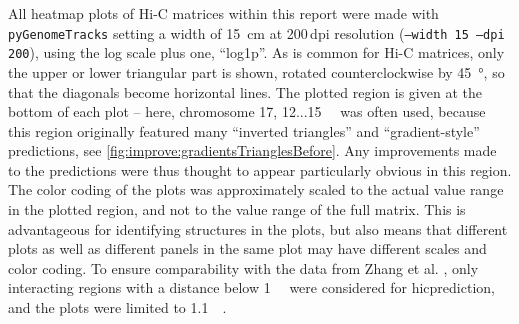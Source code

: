 All heatmap plots of Hi-C matrices within this report were made with \texttt{pyGenomeTracks} setting a width of \SI{15}{\centi\meter}
at 200\,dpi resolution (\texttt{--width 15 --dpi 200}), using the log scale plus one, ``log1p''.
As is common for Hi-C matrices, only the upper or lower triangular part is shown, rotated counterclockwise by \SI{45}{\degree},
so that the diagonals become horizontal lines.
The plotted region is given at the bottom of each plot -- here, chromosome 17, 12...\SI{15}{\mega\bp} was often used,
because this region originally featured many ``inverted triangles'' and ``gradient-style'' predictions, 
see \autoref{fig:improve:gradientsTrianglesBefore}.
Any improvements made to the predictions were thus thought to appear particularly obvious in this region.
The color coding of the plots was approximately scaled to the actual value range in the plotted region,
and not to the value range of the full matrix.
This is advantageous for identifying structures in the plots, 
but also means that different plots as well as different panels in the same plot may have different scales and color coding.
To ensure comparability with the data from Zhang et al. \cite{Zhang2019}, 
only interacting regions with a distance below \SI{1}{\mega\bp} were considered for hicprediction,
and the plots were limited to \SI{1.1}{\mega\bp}.


